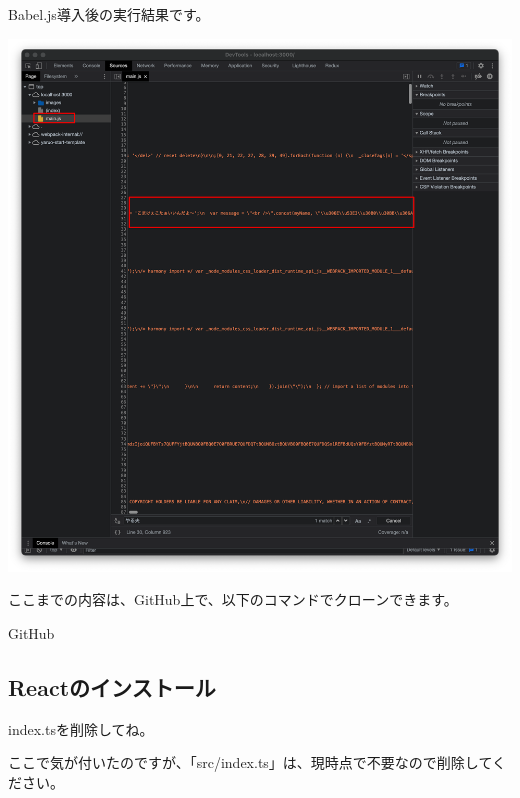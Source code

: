 \clearpage


Babel.js導入後の実行結果です。

\begin{reviewimage}%
\includegraphics[width=0.9\maxwidth]{./images/02-create-react-app/babel07.png}%
\label{image:02-create-react-app:babel07}
\end{reviewimage}
\begin{starternote}[]{}

ここまでの内容は、GitHub上で、以下のコマンドでクローンできます。

\def\startercodeblockfontsize{}
\begin{starterterminal}[]{GitHub}\end{starterterminal}
\end{starternote}

\subsection{Reactのインストール}
\keeplastskip{
  \label{sec:2-2-7}
  \label{sec04-react}
  \par\nobreak
}
\begin{starterwarning}{index.tsを削除してね。}

ここで気が付いたのですが、「src/index.ts」は、現時点で不要なので削除してください。

\end{starterwarning}

